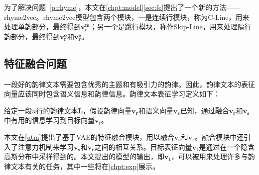 为了解决问题~\ref{p:rhyme}，本文在{\ref{chpt:model}\ref{sec:fe}}提出了一个新的方法——rhyme2vec。rhyme2vec模型包含两个模块，一是连续行模块，称为C-Line，用来处理单韵部分，最终得到$\bm {v_{r}^{m}}$；另一个是跳行模块，称作Skip-Line，用来处理隔行韵部分，最终得到$\bm {v_{r}^{o}}$和$\bm {v_{r}^{e}}$。\par

\subsection{特征融合问题}
一段好的韵律文本需要包含优秀的主题和有吸引力的韵律。因此，韵律文本的表征向量应该同时包含语义信息和韵律信息。韵律文本表征学习定义如下：
\begin{mydef}
  \label{p:all}
  给定一段$n$行的韵律文本$\bm L$，假设韵律向量$\bm {v_r}$和语义向量$\bm {v_s}$已知，通过融合$\bm {v_r}$和$\bm {v_s}$中有用的信息学习到目标向量$\bm v_t$。
\end{mydef}
\par

本文在\ref{utm}提出了基于VAE的特征融合模块，用以融合$\bm {v_s}$和$\bm {v_r}$。融合模块中还引入了注意力机制来学习$\bm {v_s}$和$\bm {v_r}$之间的相互关系。目标表征向量$\bm {v_t}$是通过在一个隐含高斯分布中采样得到的。本文提出的模型的输出，即$\bm {v_t}$，可以被用来处理许多与韵律文本有关的任务，其中一些将在\ref{chpt:exp}展示。\par

